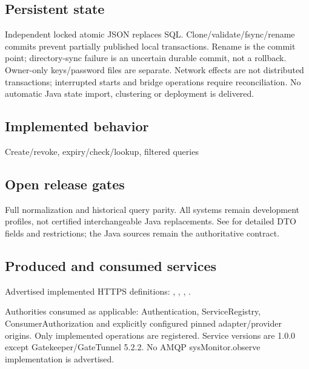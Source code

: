 \documentclass[a4paper]{arrowhead}
\begin{document}
\subsection{Persistent state}
Independent locked atomic JSON replaces SQL. Clone/validate/fsync/rename commits prevent partially published local transactions. Rename is the commit point; directory-sync failure is an uncertain durable commit, not a rollback. Owner-only keys/password files are separate. Network effects are not distributed transactions; interrupted starts and bridge operations require reconciliation. No automatic Java state import, clustering or deployment is delivered.
\subsection{Implemented behavior}
Create/revoke, expiry/check/lookup, filtered queries
\subsection{Open release gates}
Full normalization and historical query parity. All systems remain development profiles, not certified interchangeable Java replacements. See  for detailed DTO fields and restrictions; the Java sources remain the authoritative contract.
\subsection{Produced and consumed services}
Advertised implemented HTTPS definitions: , \allowbreak {}, \allowbreak {}, \allowbreak {}.\par
Authorities consumed as applicable: Authentication, ServiceRegistry, ConsumerAuthorization and explicitly configured pinned adapter/provider origins. Only implemented operations are registered. Service versions are 1.0.0 except Gatekeeper/GateTunnel 5.2.2. No AMQP sysMonitor.observe implementation is advertised.
\clearpage
\end{document}
